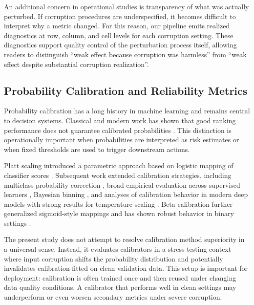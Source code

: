 \documentclass{AuthorGuide/ijitcs}
\begin{document}
An additional concern in operational studies is transparency of what was actually perturbed. If corruption procedures are underspecified, it becomes difficult to interpret why a metric changed. For this reason, our pipeline emits realized diagnostics at row, column, and cell levels for each corruption setting. These diagnostics support quality control of the perturbation process itself, allowing readers to distinguish ``weak effect because corruption was harmless'' from ``weak effect despite substantial corruption realization''.

\subsection{Probability Calibration and Reliability Metrics}
Probability calibration has a long history in machine learning and remains central to decision systems. Classical and modern work has shown that good ranking performance does not guarantee calibrated probabilities \cite{platt2000probabilities,zadrozny2002transforming,niculescu2005predicting,naeini2015bbq,guo2017calibration,kull2017beta}. This distinction is operationally important when probabilities are interpreted as risk estimates or when fixed thresholds are used to trigger downstream actions.

Platt scaling introduced a parametric approach based on logistic mapping of classifier scores \cite{platt2000probabilities}. Subsequent work extended calibration strategies, including multiclass probability correction \cite{zadrozny2002transforming}, broad empirical evaluation across supervised learners \cite{niculescu2005predicting}, Bayesian binning \cite{naeini2015bbq}, and analyses of calibration behavior in modern deep models with strong results for temperature scaling \cite{guo2017calibration}. Beta calibration further generalized sigmoid-style mappings and has shown robust behavior in binary settings \cite{kull2017beta}.

The present study does not attempt to resolve calibration method superiority in a universal sense. Instead, it evaluates calibrators in a stress-testing context where input corruption shifts the probability distribution and potentially invalidates calibration fitted on clean validation data. This setup is important for deployment: calibration is often trained once and then reused under changing data quality conditions. A calibrator that performs well in clean settings may underperform or even worsen secondary metrics under severe corruption.
\end{document}

